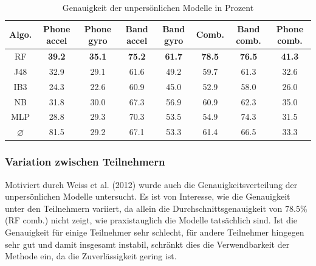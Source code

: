 \begin{table}
\centering
\begin{tabular}{|c|c|c|c|c|c|c|c|}
	\hline 
	\textbf{Algo.} & \textbf{Phone accel} & \textbf{Phone gyro} & \textbf{Band accel} & \textbf{Band gyro} & \textbf{Comb.} & \textbf{Band comb.} & \textbf{Phone comb.} \\ 
	\hline 
	RF & \textbf{39.2} & \textbf{35.1} & \textbf{75.2} & \textbf{61.7} & \textbf{78.5} & \textbf{76.5} & \textbf{41.3} \\ 
	J48 & 32.9 & 29.1 & 61.6 & 49.2 & 59.7 & 61.3 & 32.6 \\ 
	IB3 & 24.3 & 22.6 & 60.9 & 45.0 & 52.9 & 58.0 & 26.0 \\ 
	NB & 31.8 & 30.0 & 67.3 & 56.9 & 60.9 & 62.3 & 35.0 \\ 
	MLP & 28.8 & 29.3 & 70.3 & 53.5 & 54.9 & 74.3 & 31.5 \\ 
	\hline 
	$\varnothing$ & 81.5 & 29.2 & 67.1 & 53.3 & 61.4 & 66.5 & 33.3 \\ 
	\hline 
\end{tabular} 
\caption{Genauigkeit der unpersönlichen Modelle in Prozent}
\label{tab:accuracy-impersonal}
\end{table}

\subsubsection{Variation zwischen Teilnehmern}
Motiviert durch Weiss et al. (2012) \cite{Weiss2012} wurde auch die Genauigkeitsverteilung der unpersönlichen Modelle untersucht. Es ist von Interesse, wie die Genauigkeit unter den Teilnehmern variiert, da allein die Durchschnittsgenauigkeit von $78.5 \%$ (RF comb.) nicht zeigt, wie praxistauglich die Modelle tatsächlich sind. Ist die Genauigkeit für einige Teilnehmer sehr schlecht, für andere Teilnehmer hingegen sehr gut und damit insgesamt instabil, schränkt dies die Verwendbarkeit der Methode ein, da die Zuverlässigkeit gering ist.

